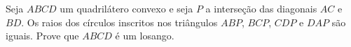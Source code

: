 Seja $ABCD$ um quadrilátero convexo e seja $P$ a interseção das diagonais $AC$ e $BD$. Os raios dos círculos inscritos nos triângulos $ABP$, $BCP$, $CDP$ e $DAP$ são iguais. Prove que $ABCD$ é um losango.